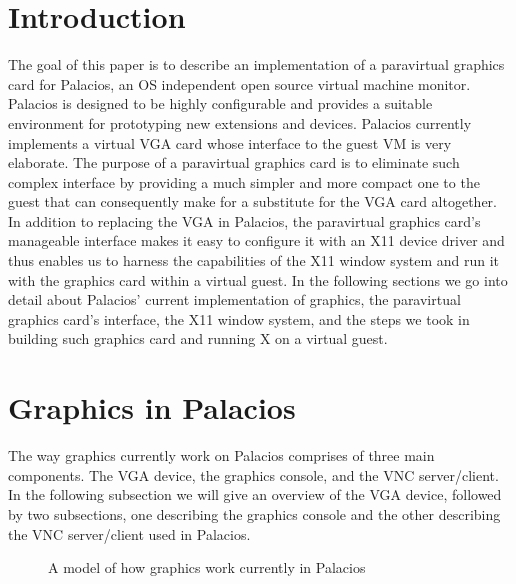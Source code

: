 \documentclass{acm_proc_article-sp}
\begin{document}
\section{Introduction}
The goal of this paper is to describe an implementation of a paravirtual
graphics card for Palacios, an OS independent open source virtual machine
monitor. \cite{Lange: Technical} Palacios is designed to be 
highly configurable and provides a suitable environment
for prototyping new extensions and devices. Palacios currently implements
  a virtual VGA card whose interface to the guest VM is very elaborate. The
  purpose of a paravirtual graphics card is to eliminate such complex interface
  by providing a much simpler and more compact one to the guest that can
  consequently make for a substitute for the VGA card altogether. In addition to
  replacing the VGA in Palacios, the paravirtual graphics card's manageable
  interface makes it easy to configure it with an X11 device driver and thus
  enables us to harness the capabilities of the X11 window system and run it with the
  graphics card within a virtual guest. In the following sections we go into
  detail about Palacios' current implementation of graphics, the paravirtual
  graphics card's interface, the X11 window system, and the steps we took in
  building such graphics card and running X on a virtual guest.

\section{Graphics in Palacios}
The way graphics currently work on Palacios comprises of three main components.
The VGA device, the graphics console, and the VNC server/client. In the
following subsection we will give an overview of the VGA device, followed by two
subsections, one describing the graphics console and the other describing the
VNC server/client used in Palacios.

\begin{figure}[h]                                              
\centering                                                 
{}                                      
\caption{A model of how graphics work currently in Palacios}   
\end{figure}                                               
\end{document}
